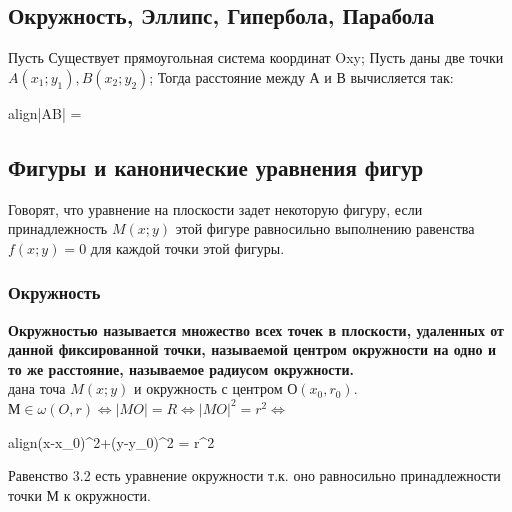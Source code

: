 \documentclass[oneside]{book}
\newcommand{\boxedeq}[2]{\begin{empheq}[box={\fboxsep=6pt\fbox}]{align}\label{#1}#2\end{empheq}}
\begin{document}
\begin{enumerate}
\chapter[Плоские фигуры]{Окружность, Эллипс, Гипербола, Парабола}
Пусть Существует прямоугольная система координат Oxy; Пусть даны две точки $A(x_1; y_1), B(x_2; y_2)$;
Тогда расстояние между А и В вычисляется так: \boxedeq{eq:*}{|AB| = }

\section[Уравнения фигур]{Фигуры и канонические уравнения фигур}
Говорят, что уравнение на плоскости задет некоторую фигуру, если принадлежность $M(x; y)$ этой фигуре равносильно
выполнению равенства $f(x; y) = 0$ для каждой точки этой фигуры.

\subsection{Окружность}
\textbf{Окружностью называется множество всех точек в плоскости, удаленных от данной фиксированной точки, называемой
центром окружности на одно и то же расстояние, называемое радиусом окружности.} \\
дана точа $M(x; y)$ и окружность с центром О$(x_0, r_0)$. $М \in \omega(O, r) \Leftrightarrow |MO|=R \Leftrightarrow
|MO|^2 = r^2 \Leftrightarrow$ \boxedeq{eq:*}{(x-x_0)^2+(y-y_0)^2 = r^2}
Равенство 3.2 есть уравнение окружности т.к. оно равносильно принадлежности точки М к окружности.


\end{enumerate}
\end{document}
